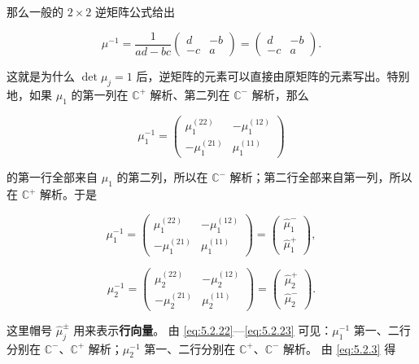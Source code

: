 \documentclass[
    lang=cn,
    scheme=chinese,
    mode=simple,
    device=normal,
    color=blue,
    math=cm,
    thmcnt=section,
    12pt,
    nowatermark
]{elegantbook}
\begin{document}
那么一般的 $2\times2$ 逆矩阵公式给出

\[
    \mu^{-1}
    =
    \dfrac{1}{ad-bc}
    \begin{pmatrix}
        d  & -b \\
        -c & a
    \end{pmatrix}
    =
    \begin{pmatrix}
        d  & -b \\
        -c & a
    \end{pmatrix}.
\]

这就是为什么 $\det\mu_j=1$ 后，逆矩阵的元素可以直接由原矩阵的元素写出。特别地，如果 $\mu_1$ 的第一列在 $\mathbb{C}^+$ 解析、第二列在 $\mathbb{C}^-$ 解析，那么

\[
    \mu_1^{-1}
    =
    \begin{pmatrix}
        \mu_1^{(22)}  & -\mu_1^{(12)} \\
        -\mu_1^{(21)} & \mu_1^{(11)}
    \end{pmatrix}
\]

的第一行全部来自 $\mu_1$ 的第二列，所以在 $\mathbb{C}^-$ 解析；第二行全部来自第一列，所以在 $\mathbb{C}^+$ 解析。于是

\begin{equation}
    \mu_1^{-1}
    =
    \begin{pmatrix}
        \mu_1^{(22)}  & -\mu_1^{(12)} \\
        -\mu_1^{(21)} & \mu_1^{(11)}
    \end{pmatrix}
    =
    \begin{pmatrix}
        \widehat\mu_1^- \\
        \widehat\mu_1^+
    \end{pmatrix},
    \tag{5.2.22}
    \label{eq:5.2.22}
\end{equation}

\begin{equation}
    \mu_2^{-1}
    =
    \begin{pmatrix}
        \mu_2^{(22)}  & -\mu_2^{(12)} \\
        -\mu_2^{(21)} & \mu_2^{(11)}
    \end{pmatrix}
    =
    \begin{pmatrix}
        \widehat\mu_2^+ \\
        \widehat\mu_2^-
    \end{pmatrix}.
    \tag{5.2.23}
    \label{eq:5.2.23}
\end{equation}

这里帽号 $\widehat\mu_j^\pm$ 用来表示\textbf{行向量}。
由 \eqref{eq:5.2.22}---\eqref{eq:5.2.23} 可见：$\mu_1^{-1}$ 第一、二行分别在 $\mathbb{C}^-$、$\mathbb{C}^+$ 解析；$\mu_2^{-1}$ 第一、二行分别在 $\mathbb{C}^+$、$\mathbb{C}^-$ 解析。
由 \eqref{eq:5.2.3} 得
\end{document}
